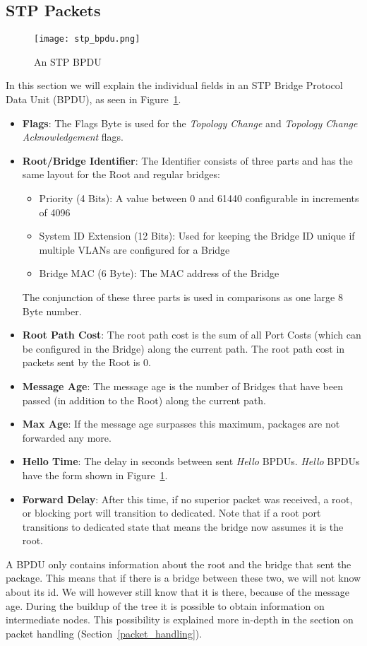 \subsection*{STP Packets}
\label{stp_packet}
\begin{figure}[h]
    \centering
    \texttt{[image: stp\_bpdu.png]}
    \caption{An STP BPDU}
    \label{fig:stp_bpdu}
\end{figure}
In this section we will explain the individual fields in an STP Bridge Protocol Data Unit (BPDU), as seen in Figure~\ref{fig:stp_bpdu}.
\begin{itemize}
    \item \textbf{Flags}: The Flags Byte is used for the \textit{Topology Change} and \textit{Topology Change Acknowledgement} flags.
    \item \textbf{Root/Bridge Identifier}: The Identifier consists of three parts and has the same layout for the Root and regular bridges:
        \begin{itemize}
            \item Priority (4 Bits): A value between 0 and 61440 configurable in increments of 4096
            \item System ID Extension (12 Bits): Used for keeping the Bridge ID unique if multiple VLANs are configured for a Bridge
            \item Bridge MAC (6 Byte): The MAC address of the Bridge
        \end{itemize}
        The conjunction of these three parts is used in comparisons as one large 8 Byte number.
    \item \textbf{Root Path Cost}: The root path cost is the sum of all Port Costs (which can be configured in the Bridge) along the current path. The root path cost in packets sent by the Root is 0.
    \item \textbf{Message Age}: The message age is the number of Bridges that have been passed (in addition to the Root) along the current path.
    \item \textbf{Max Age}: If the message age surpasses this maximum, packages are not forwarded any more.
    \item \textbf{Hello Time}: The delay in seconds between sent \textit{Hello} BPDUs.
        \textit{Hello} BPDUs have the form shown in Figure~\ref{fig:stp_bpdu}.
    \item \textbf{Forward Delay}: After this time, if no superior packet was received, a root, or blocking port will transition to dedicated.
        Note that if a root port transitions to dedicated state that means the bridge now assumes it is the root.
\end{itemize}
A BPDU only contains information about the root and the bridge that sent the package.
This means that if there is a bridge between these two, we will not know about its id.
We will however still know that it is there, because of the message age.
During the buildup of the tree it is possible to obtain information on intermediate nodes.
This possibility is explained more in-depth in the section on packet handling (Section~\ref{packet_handling}).

